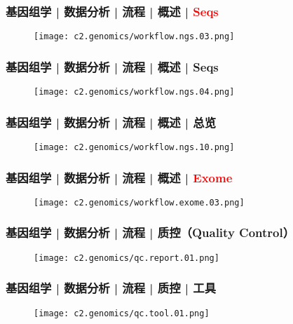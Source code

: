 \begin{frame}
  \frametitle{基因组学 | 数据分析 | 流程 | 概述 | \textcolor{red}{Seqs}}
  \begin{figure}
    \centering
    \texttt{[image: c2.genomics/workflow.ngs.03.png]}
  \end{figure}
\end{frame}

\begin{frame}
  \frametitle{基因组学 | 数据分析 | 流程 | 概述 | Seqs}
  \begin{figure}
    \centering
    \texttt{[image: c2.genomics/workflow.ngs.04.png]}
  \end{figure}
\end{frame}

\begin{frame}
  \frametitle{基因组学 | 数据分析 | 流程 | 概述 | 总览}
  \begin{figure}
    \centering
    \texttt{[image: c2.genomics/workflow.ngs.10.png]}
  \end{figure}
\end{frame}

\begin{frame}
  \frametitle{基因组学 | 数据分析 | 流程 | 概述 | \textcolor{red}{Exome}}
  \begin{figure}
    \centering
    \texttt{[image: c2.genomics/workflow.exome.03.png]}
  \end{figure}
\end{frame}

\begin{frame}
  \frametitle{基因组学 | 数据分析 | 流程 | 质控（Quality Control）}
  \begin{figure}
    \centering
    \texttt{[image: c2.genomics/qc.report.01.png]}
  \end{figure}
\end{frame}

\begin{frame}
  \frametitle{基因组学 | 数据分析 | 流程 | 质控 | 工具}
  \begin{figure}
    \centering
    \texttt{[image: c2.genomics/qc.tool.01.png]}
  \end{figure}
\end{frame}

